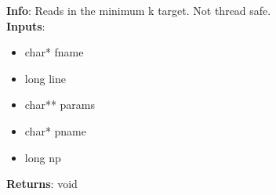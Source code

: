 \textbf{Info}: Reads in the minimum k target. Not thread safe. \\

\noindent \textbf{Inputs}:
\begin{itemize}
\item{char* fname}
\item{long line}
\item{char** params}
\item{char* pname}
\item{long np}
\end{itemize}

\noindent \textbf{Returns}: void
